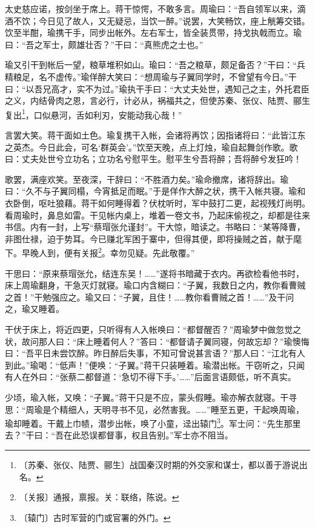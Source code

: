 \documentclass[12pt,UTF-8,openany]{ctexbook}
\begin{document}
\begin{large}
    太史慈应诺，按剑坐于席上。蒋干惊愕，不敢多言。周瑜曰：“吾自领军以来，滴酒不饮；今日见了故人，又无疑忌，当饮一醉。”说罢，大笑畅饮，座上觥筹交错。饮至半酣，瑜携干手，同步出帐外。左右军士，皆全装贯带，持戈执戟而立。瑜曰：“吾之军士，颇雄壮否？”干曰：“真熊虎之士也。”
    
    瑜又引干到帐后一望，粮草堆积如山。瑜曰：“吾之粮草，颇足备否？”干曰：“兵精粮足，名不虚传。”瑜佯醉大笑曰：“想周瑜与子翼同学时，不曾望有今日。”干曰：“以吾兄高才，实不为过。”瑜执干手曰：“大丈夫处世，遇知己之主，外托君臣之义，内结骨肉之恩，言必行，计必从，祸福共之，但使苏秦、张仪、陆贾、郦生复出\footnote{〔苏秦、张仪、陆贾、郦生〕战国秦汉时期的外交家和谋士，都以善于游说出名。}，口似悬河，舌如利刃，安能动我心哉！”
    
    言罢大笑。蒋干面如土色。瑜复携干入帐，会诸将再饮；因指诸将曰：“此皆江东之英杰。今日此会，可名‘群英会’。”饮至天晚，点上灯烛，瑜自起舞剑作歌。歌曰：丈夫处世兮立功名；立功名兮慰平生。慰平生兮吾将醉；吾将醉兮发狂吟！
    
    歌罢，满座欢笑。至夜深，干辞曰：“不胜酒力矣。”瑜命撤席，诸将辞出。瑜曰：“久不与子翼同榻，今宵抵足而眠。”于是佯作大醉之状，携干入帐共寝。瑜和衣卧倒，呕吐狼藉。蒋干如何睡得着？伏枕听时，军中鼓打二更，起视残灯尚明。看周瑜时，鼻息如雷。干见帐内桌上，堆着一卷文书，乃起床偷视之，却都是往来书信。内有一封，上写“蔡瑁张允谨封”。干大惊，暗读之。书略曰：“某等降曹，非图仕禄，迫于势耳。今已赚北军困于寨中，但得其便，即将操贼之首，献于麾下。早晚人到，便有关报\footnote{〔关报〕通报，禀报。关：联络，陈说。}。幸勿见疑。先此敬覆。”
    
    干思曰：“原来蔡瑁张允，结连东吴！……”遂将书暗藏于衣内。再欲检看他书时，床上周瑜翻身，干急灭灯就寝。瑜口内含糊曰：“子翼，我数日之内，教你看曹贼之首！”干勉强应之。瑜又曰：“子翼，且住！……教你看曹贼之首！……”及干问之，瑜又睡着。
    
    干伏于床上，将近四更，只听得有人入帐唤曰：“都督醒否？”周瑜梦中做忽觉之状，故问那人曰：“床上睡着何人？”答曰：“都督请子翼同寝，何故忘却？”瑜懊悔曰：“吾平日未尝饮醉。昨日醉后失事，不知可曾说甚言语？”那人曰：“江北有人到此。”瑜喝：“低声！”便唤：“子翼。”蒋干只装睡着。瑜潜出帐。干窃听之，只闻有人在外曰：“张蔡二都督道：‘急切不得下手。’……”后面言语颇低，听不真实。
    
    少顷，瑜入帐，又唤：“子翼。”蒋干只是不应，蒙头假睡。瑜亦解衣就寝。干寻思：“周瑜是个精细人，天明寻书不见，必然害我。……”睡至五更，干起唤周瑜，瑜却睡着。干戴上巾帻，潜步出帐，唤了小童，迳出辕门\footnote{〔辕门〕古时军营的门或官署的外门。}。军士问：“先生那里去？”干曰：“吾在此恐误都督事，权且告别。”军士亦不阻当。
    

\end{large}
\end{document}
